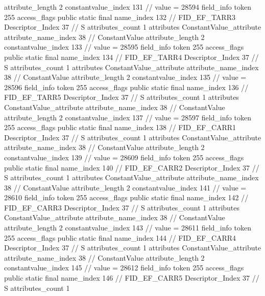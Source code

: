 {{{{{{{					attribute_length	2
					constantvalue_index	131		// value = 28594
				}
				}
			}
			field_info {
				token	255
				access_flags	public static final
				name_index	132		// FID_EF_TARR3
				Descriptor_Index	37		// S
				attributes_count	1
				attributes {
				ConstantValue_attribute {
					attribute_name_index	38		// ConstantValue
					attribute_length	2
					constantvalue_index	133		// value = 28595
				}
				}
			}
			field_info {
				token	255
				access_flags	public static final
				name_index	134		// FID_EF_TARR4
				Descriptor_Index	37		// S
				attributes_count	1
				attributes {
				ConstantValue_attribute {
					attribute_name_index	38		// ConstantValue
					attribute_length	2
					constantvalue_index	135		// value = 28596
				}
				}
			}
			field_info {
				token	255
				access_flags	public static final
				name_index	136		// FID_EF_TARR5
				Descriptor_Index	37		// S
				attributes_count	1
				attributes {
				ConstantValue_attribute {
					attribute_name_index	38		// ConstantValue
					attribute_length	2
					constantvalue_index	137		// value = 28597
				}
				}
			}
			field_info {
				token	255
				access_flags	public static final
				name_index	138		// FID_EF_CARR1
				Descriptor_Index	37		// S
				attributes_count	1
				attributes {
				ConstantValue_attribute {
					attribute_name_index	38		// ConstantValue
					attribute_length	2
					constantvalue_index	139		// value = 28609
				}
				}
			}
			field_info {
				token	255
				access_flags	public static final
				name_index	140		// FID_EF_CARR2
				Descriptor_Index	37		// S
				attributes_count	1
				attributes {
				ConstantValue_attribute {
					attribute_name_index	38		// ConstantValue
					attribute_length	2
					constantvalue_index	141		// value = 28610
				}
				}
			}
			field_info {
				token	255
				access_flags	public static final
				name_index	142		// FID_EF_CARR3
				Descriptor_Index	37		// S
				attributes_count	1
				attributes {
				ConstantValue_attribute {
					attribute_name_index	38		// ConstantValue
					attribute_length	2
					constantvalue_index	143		// value = 28611
				}
				}
			}
			field_info {
				token	255
				access_flags	public static final
				name_index	144		// FID_EF_CARR4
				Descriptor_Index	37		// S
				attributes_count	1
				attributes {
				ConstantValue_attribute {
					attribute_name_index	38		// ConstantValue
					attribute_length	2
					constantvalue_index	145		// value = 28612
				}
				}
			}
			field_info {
				token	255
				access_flags	public static final
				name_index	146		// FID_EF_CARR5
				Descriptor_Index	37		// S
				attributes_count	1
}}}}}
